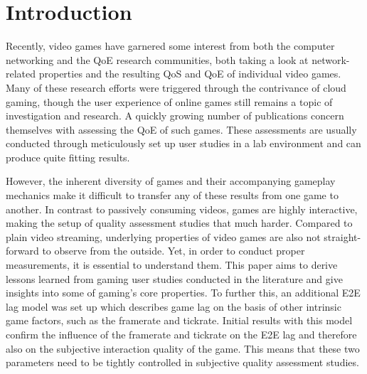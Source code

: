 \section{Introduction}
\label{sec:introduction}

Recently, video games have garnered some interest from both the computer networking and the \gls{QoE} research communities, both taking a look at network-related properties and the resulting \acrshort{QoS} and \gls{QoE} of individual video games. Many of these research efforts were triggered through the contrivance of cloud gaming, though the user experience of online games still remains a topic of investigation and research. A quickly growing number of publications concern themselves with assessing the \gls{QoE} of such games. These assessments are usually conducted through meticulously set up user studies in a lab environment and can produce quite fitting results.

However, the inherent diversity of games and their accompanying gameplay mechanics make it difficult to transfer any of these results from one game to another. In contrast to passively consuming videos, games are highly interactive, making the setup of quality assessment studies that much harder. Compared to plain video streaming, underlying properties of video games are also not straight-forward to observe from the outside. Yet, in order to conduct proper measurements, it is essential to understand them. This paper aims to derive lessons learned from gaming user studies conducted in the literature and give insights into some of gaming's core properties. To further this, an additional \gls{E2E} lag model was set up which describes game lag on the basis of other intrinsic game factors, such as the framerate and tickrate. Initial results with this model confirm the influence of the framerate and tickrate on the \gls{E2E} lag and therefore also on the subjective interaction quality of the game. This means that these two parameters need to be tightly controlled in subjective quality assessment studies.
